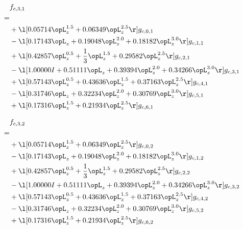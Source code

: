 \begin{alignat}{2} 
\label{eq:f_31_0} 
& f_{c,3,1} \nonumber \\ 
 = \\ 
& + \l[  0.05714 \opL_z^{1.5} +  0.06349 \opL_z^{2.5}  \r] g_{c,0,1} \nonumber \\ 
& - \l[  0.17143 \opL_z +  0.19048 \opL_z^{2.0} +  0.18182 \opL_z^{3.0}  \r] g_{c,1,1} \nonumber \\ 
& + \l[  0.42857 \opL_z^{0.5} + \frac{1}{3} \opL_z^{1.5} +  0.29582 \opL_z^{2.5}  \r] g_{c,2,1} \nonumber \\ 
& - \l[  1.00000 I +  0.51111 \opL_z +  0.39394 \opL_z^{2.0} +  0.34266 \opL_z^{3.0}  \r] g_{c,3,1} \nonumber \\ 
& + \l[  0.57143 \opL_z^{0.5} +  0.43636 \opL_z^{1.5} +  0.37163 \opL_z^{2.5}  \r] g_{c,4,1} \nonumber \\ 
& - \l[  0.31746 \opL_z +  0.32234 \opL_z^{2.0} +  0.30769 \opL_z^{3.0}  \r] g_{c,5,1} \nonumber \\ 
& + \l[  0.17316 \opL_z^{1.5} +  0.21934 \opL_z^{2.5}  \r] g_{c,6,1} \nonumber \\ 
\end{alignat} 


\begin{alignat}{2} 
\label{eq:f_32_0} 
& f_{c,3,2} \nonumber \\ 
 = \\ 
& + \l[  0.05714 \opL_z^{1.5} +  0.06349 \opL_z^{2.5}  \r] g_{c,0,2} \nonumber \\ 
& - \l[  0.17143 \opL_z +  0.19048 \opL_z^{2.0} +  0.18182 \opL_z^{3.0}  \r] g_{c,1,2} \nonumber \\ 
& + \l[  0.42857 \opL_z^{0.5} + \frac{1}{3} \opL_z^{1.5} +  0.29582 \opL_z^{2.5}  \r] g_{c,2,2} \nonumber \\ 
& - \l[  1.00000 I +  0.51111 \opL_z +  0.39394 \opL_z^{2.0} +  0.34266 \opL_z^{3.0}  \r] g_{c,3,2} \nonumber \\ 
& + \l[  0.57143 \opL_z^{0.5} +  0.43636 \opL_z^{1.5} +  0.37163 \opL_z^{2.5}  \r] g_{c,4,2} \nonumber \\ 
& - \l[  0.31746 \opL_z +  0.32234 \opL_z^{2.0} +  0.30769 \opL_z^{3.0}  \r] g_{c,5,2} \nonumber \\ 
& + \l[  0.17316 \opL_z^{1.5} +  0.21934 \opL_z^{2.5}  \r] g_{c,6,2} \nonumber \\ 
\end{alignat} 


